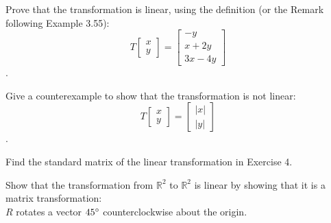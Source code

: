 \documentclass[11pt,letterpaper,boxed]{hmcpset}
\begin{document}

\begin{problem}[3.6 \#4]
    Prove that the transformation is linear, using the definition (or the Remark following Example 3.55):
    \[
    T\begin{bmatrix}
    x \\ y
    \end{bmatrix} = 
    \begin{bmatrix}
    -y \\ x + 2y \\ 3x - 4y
    \end{bmatrix}
    \].
\end{problem}

\begin{solution}
    \vfill
\end{solution}

\newpage


\begin{problem}[3.6 \#8]
    Give a counterexample to show that the transformation is not linear:
    \[
    T\begin{bmatrix}
    x \\ y
    \end{bmatrix} = 
    \begin{bmatrix}
    |x| \\ |y|
    \end{bmatrix}
    \].
\end{problem}

\begin{solution}
    \vfill
\end{solution}

\newpage


\begin{problem}[3.6 \#12]
    Find the standard matrix of the linear transformation in Exercise 4.
\end{problem}

\begin{solution}
    \vfill
\end{solution}

\newpage


\begin{problem}[3.6 \#16]
    Show that the transformation from $\mathbb{R}^2$ to $\mathbb{R}^2$ is linear by showing that it is a matrix transformation: \\
    	$R$ rotates a vector $45\degree$ counterclockwise about the origin.
\end{problem}
\end{document}
